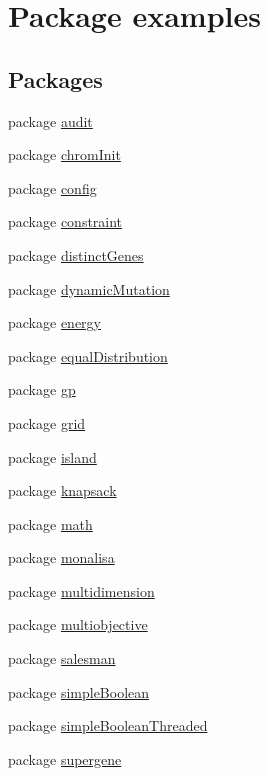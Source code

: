 \hypertarget{namespaceexamples}{\section{Package examples}
\label{namespaceexamples}
}
\subsection*{Packages}
\begin{DoxyCompactItemize}
\item 
package \hyperlink{namespaceexamples_1_1audit}{audit}
\item 
package \hyperlink{namespaceexamples_1_1chrom_init}{chrom\-Init}
\item 
package \hyperlink{namespaceexamples_1_1config}{config}
\item 
package \hyperlink{namespaceexamples_1_1constraint}{constraint}
\item 
package \hyperlink{namespaceexamples_1_1distinct_genes}{distinct\-Genes}
\item 
package \hyperlink{namespaceexamples_1_1dynamic_mutation}{dynamic\-Mutation}
\item 
package \hyperlink{namespaceexamples_1_1energy}{energy}
\item 
package \hyperlink{namespaceexamples_1_1equal_distribution}{equal\-Distribution}
\item 
package \hyperlink{namespaceexamples_1_1gp}{gp}
\item 
package \hyperlink{namespaceexamples_1_1grid}{grid}
\item 
package \hyperlink{namespaceexamples_1_1island}{island}
\item 
package \hyperlink{namespaceexamples_1_1knapsack}{knapsack}
\item 
package \hyperlink{namespaceexamples_1_1math}{math}
\item 
package \hyperlink{namespaceexamples_1_1monalisa}{monalisa}
\item 
package \hyperlink{namespaceexamples_1_1multidimension}{multidimension}
\item 
package \hyperlink{namespaceexamples_1_1multiobjective}{multiobjective}
\item 
package \hyperlink{namespaceexamples_1_1salesman}{salesman}
\item 
package \hyperlink{namespaceexamples_1_1simple_boolean}{simple\-Boolean}
\item 
package \hyperlink{namespaceexamples_1_1simple_boolean_threaded}{simple\-Boolean\-Threaded}
\item 
package \hyperlink{namespaceexamples_1_1supergene}{supergene}
\end{DoxyCompactItemize}
